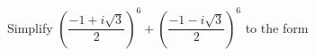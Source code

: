 Simplify $\left(\dfrac{-1+i\sqrt{3}}{2}\right)^6+\left(\dfrac{-1-i\sqrt{3}}{2}\right)^6$ to the form 